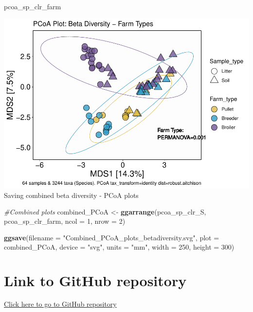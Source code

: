 \documentclass[
]{article}
\newenvironment{Shaded}{\begin{snugshade}}{\end{snugshade}}
\newcommand{\AttributeTok}[1]{\textcolor[rgb]{0.13,0.29,0.53}{#1}}
\newcommand{\CommentTok}[1]{\textcolor[rgb]{0.56,0.35,0.01}{\textit{#1}}}
\newcommand{\DecValTok}[1]{\textcolor[rgb]{0.00,0.00,0.81}{#1}}
\newcommand{\FunctionTok}[1]{\textcolor[rgb]{0.13,0.29,0.53}{\textbf{#1}}}
\newcommand{\NormalTok}[1]{#1}
\newcommand{\OtherTok}[1]{\textcolor[rgb]{0.56,0.35,0.01}{#1}}
\newcommand{\StringTok}[1]{\textcolor[rgb]{0.31,0.60,0.02}{#1}}
\begin{document}
\begin{Shaded}
\begin{Highlighting}[]
\NormalTok{pcoa\_sp\_clr\_farm}
\end{Highlighting}
\end{Shaded}

\includegraphics{Final_Project_Pankaj_files/figure-latex/drawing PCoA plots-2.pdf}
Saving combined beta diversity - PCoA plots

\begin{Shaded}
\begin{Highlighting}[]
\CommentTok{\#Combined plots}
\NormalTok{combined\_PCoA }\OtherTok{\textless{}{-}} \FunctionTok{ggarrange}\NormalTok{(pcoa\_sp\_clr\_S, pcoa\_sp\_clr\_farm,}
                           \AttributeTok{ncol =} \DecValTok{1}\NormalTok{,}
                           \AttributeTok{nrow =} \DecValTok{2}\NormalTok{)}


\FunctionTok{ggsave}\NormalTok{(}\AttributeTok{filename =} \StringTok{"Combined\_PCoA\_plots\_betadiversity.svg"}\NormalTok{,}
        \AttributeTok{plot =}\NormalTok{ combined\_PCoA,}
        \AttributeTok{device =} \StringTok{"svg"}\NormalTok{,}
        \AttributeTok{units =} \StringTok{"mm"}\NormalTok{,}
        \AttributeTok{width =} \DecValTok{250}\NormalTok{,}
        \AttributeTok{height =} \DecValTok{300}\NormalTok{)}
\end{Highlighting}
\end{Shaded}

\section{Link to GitHub repository}\label{link-to-github-repository}

\href{https://github.com/ppg0001/PLPA_Assignment}{Click here to go to
GitHub repository}
\end{document}
